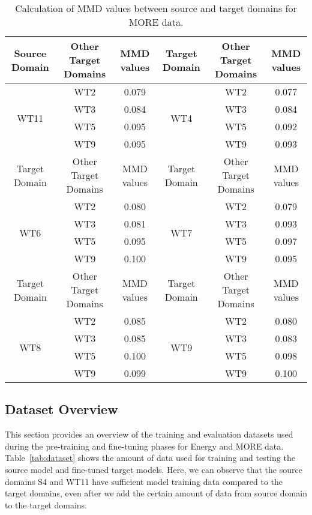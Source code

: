 \documentclass[letterpaper]{article} %
\begin{document}
\begin{table*}[t!]
\caption{Calculation of MMD values between source and target domains for MORE data.}
\centering
\label{tab:mmd_more}
\begin{tabular}{|c|c|c|c|c|c|}
\hline
Source Domain & Other Target Domains & MMD values & Target Domain & Other Target Domains & MMD values \\ \hline
\multirow{4}{*}{WT11} & WT2 & 0.079 & \multirow{4}{*}{WT4} & WT2 & 0.077 \\ \cline{2-3} \cline{5-6}
 & WT3 & 0.084 &  & WT3 & 0.084 \\ \cline{2-3} \cline{5-6}
 & WT5 & 0.095 &  & WT5 & 0.092 \\ \cline{2-3} \cline{5-6}
 & WT9 & 0.095 &  & WT9 & 0.093 \\ \hline
Target Domain & Other Target Domains & MMD values & Target Domain & Other Target Domains & MMD values \\ \hline
\multirow{4}{*}{WT6} & WT2 & 0.080 & \multirow{4}{*}{WT7} & WT2 & 0.079 \\ \cline{2-3} \cline{5-6}
 & WT3 & 0.081 &  & WT3 & 0.093 \\ \cline{2-3} \cline{5-6}
 & WT5 & 0.095 &  & WT5 & 0.097 \\ \cline{2-3} \cline{5-6}
 & WT9 & 0.100 &  & WT9 & 0.095 \\ \hline
Target Domain & Other Target Domains & MMD values & Target Domain & Other Target Domains & MMD values \\ \hline
\multirow{4}{*}{WT8} & WT2 & 0.085 & \multirow{4}{*}{WT9} & WT2 & 0.080 \\ \cline{2-3} \cline{5-6}
 & WT3 & 0.085 &  & WT3 & 0.083 \\ \cline{2-3} \cline{5-6}
 & WT5 & 0.100 &  & WT5 & 0.098 \\ \cline{2-3} \cline{5-6}
 & WT9 & 0.099 &  & WT9 & 0.100 \\ \hline
\end{tabular}
\end{table*}
\subsection{Dataset Overview}
This section provides an overview of the training and evaluation datasets used during the pre-training and fine-tuning phases for Energy and MORE data. Table~\ref{tab:dataset} shows the amount of data used for training and testing the source model and fine-tuned target models. Here, we can observe that the source domains S4 and WT11 have sufficient model training data compared to the target domains, even after we add the certain amount of data from source domain to the target domains.
\end{document}
